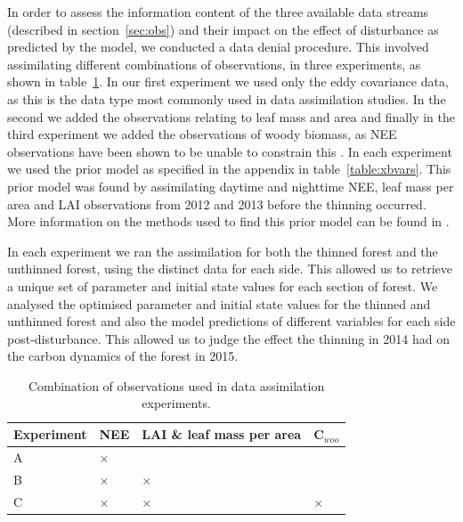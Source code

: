 In order to assess the information content of the three available data streams (described in section~\ref{sec:obs}) and their impact on the effect of disturbance as predicted by the model, we conducted a data denial procedure. This involved assimilating different combinations of observations, in three experiments, as shown in table~\ref{table:obs_da}. In our first experiment we used only the eddy covariance data, as this is the data type most commonly used in data assimilation studies. In the second we added the observations relating to leaf mass and area and finally in the third experiment we added the observations of woody biomass, as NEE observations have been shown to be unable to constrain this \citep{fox2009reflex}. In each experiment we used the prior model as specified in the appendix in table~\ref{table:xbvars}. This prior model was found by assimilating daytime and nighttime NEE, leaf mass per area and LAI observations from 2012 and 2013 before the thinning occurred. More information on the methods used to find this prior model can be found in \citet{Pinnington2016299}. 


In each experiment we ran the assimilation for both the thinned forest and the unthinned forest, using the distinct data for each side. This allowed us to retrieve a unique set of parameter and initial state values for each section of forest. We analysed the optimised parameter and initial state values for the thinned and unthinned forest and also the model predictions of different variables for each side post-disturbance. This allowed us to judge the effect the thinning in 2014 had on the carbon dynamics of the forest in 2015.

\begin{table}[ht] 
	\caption{Combination of observations used in data assimilation experiments.}
\begin{center}
	\begin{tabular}{| l | l | l | l |}
	\hline
	Experiment & NEE & LAI \& leaf mass per area & C\(_{woo}\) \\ \hline
	A & \(\times\) &  &  \\ \hline
	B & \(\times\) & \(\times\) &  \\ \hline
	C & \(\times\) & \(\times\) & \(\times\)  \\ \hline
	\end{tabular}
	\label{table:obs_da}
\end{center} 
\end{table}

